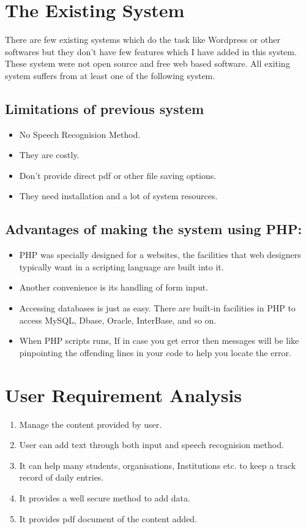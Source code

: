 \section{The Existing System}
There are few existing systems which do the task like Wordpress or other softwares but
they don't have few features which I have added in this system. These system were not open source
and free web based software.
All exiting system suffers from at least one of the following system.
 \subsection{Limitations of previous system }
\begin{itemize}
\item No Speech Recognision Method. 

\item They are costly.

\item Don't provide direct pdf or other file saving options.

\item They need installation and a lot of system resources. 

\end{itemize}
\subsection{Advantages of making the system using PHP:}
\begin{itemize}
\item PHP was specially designed for a websites, the facilities that web designers typically want in a scripting language are built into it.
\item Another convenience is its handling of form input.
\item Accessing databases is just as easy. There are built-in facilities in PHP to access MySQL, Dbase, Oracle, InterBase, and so on.
\item When PHP scripts runs, If in case  you get error then messages will be like pinpointing the offending lines in your code to help you locate the error.
\end{itemize} 
\section{User Requirement Analysis}
\begin{enumerate}
\item Manage the content provided by user.
\item User can add text through both input and speech recognision method.
\item It can help many students, organisations, Institutions etc. to keep a track record of daily entries.
\item It provides a well secure method to add data.
\item It provides pdf document of the content added.
\end{enumerate}
\newpage


